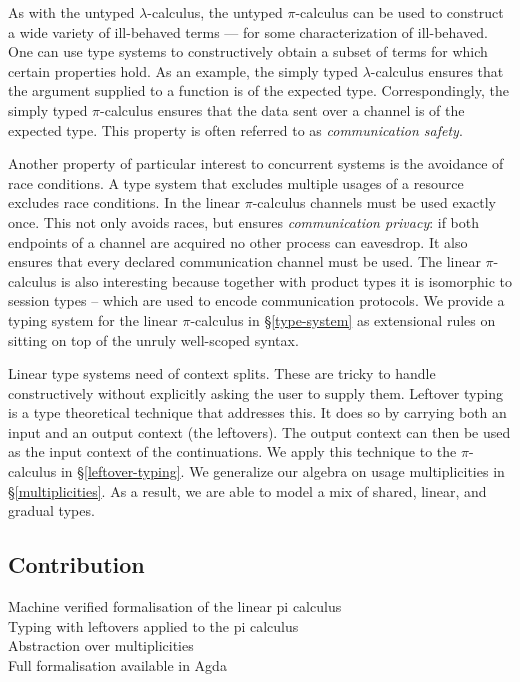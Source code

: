 \documentclass[a4paper,UKenglish,cleveref, autoref, thm-restate,authorcolumns]{lipics-v2019}
\theoremstyle{definition}
\newcommand{\lambdacalc}{$\lambda$-calculus}
\newcommand{\picalc}{$\pi$-calculus}
\begin{document}
As with the untyped \lambdacalc{}, the untyped \picalc{} can be used to construct a wide variety of ill-behaved terms --- for some characterization of ill-behaved.
One can use type systems to constructively obtain a subset of terms for which certain properties hold.
As an example, the simply typed \lambdacalc{} ensures that the argument supplied to a function is of the expected type.
Correspondingly, the simply typed \picalc{} \cite{} ensures that the data sent over a channel is of the expected type.
This property is often referred to as \emph{communication safety}.

Another property of particular interest to concurrent systems is the avoidance of race conditions.
A type system that excludes multiple usages of a resource excludes race conditions.
In the linear \picalc{} \cite{} channels must be used exactly once.
This not only avoids races, but ensures \emph{communication privacy}: if both endpoints of a channel are acquired no other process can eavesdrop.
It also ensures that every declared communication channel must be used.
The linear \picalc{} is also interesting because together with product types it is isomorphic to session types \cite{} -- which are used to encode communication protocols.
We provide a typing system for the linear \picalc{} in \S \ref{type-system} as extensional rules on sitting on top of the unruly well-scoped syntax.

Linear type systems need of context splits.
These are tricky to handle constructively without explicitly asking the user to supply them.
Leftover typing \cite{} is a type theoretical technique that addresses this.
It does so by carrying both an input and an output context (the leftovers).
The output context can then be used as the input context of the continuations.
We apply this technique to the \picalc{} in \S \ref{leftover-typing}.
We generalize our algebra on usage multiplicities in \S \ref{multiplicities}.
As a result, we are able to model a mix of shared, linear, and gradual types.


\subsection{Contribution}

\begin{description}
  \item [Machine verified formalisation of the linear pi calculus]

  \item [Typing with leftovers applied to the pi calculus]

  \item [Abstraction over multiplicities]

  \item [Full formalisation available in Agda]
\end{description}
\end{document}
